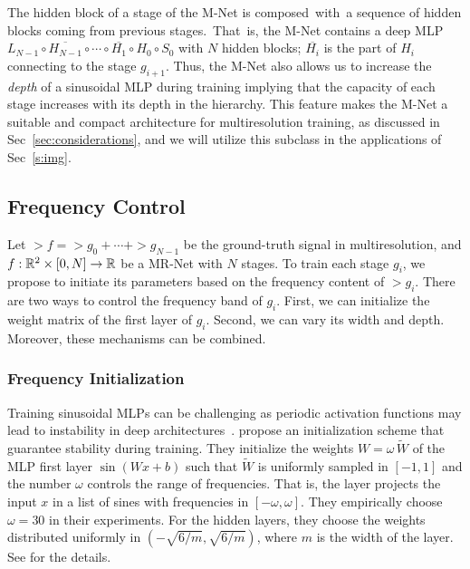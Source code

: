The hidden block of a stage of the M-Net is composed~with~a sequence of hidden blocks coming from previous stages.~That~is, the M-Net contains a deep MLP $L_{N-1} \circ \overline{H_{N-1}} \circ \cdots \circ \overline{H_1}\circ H_0 \circ S_0$ with $N$ hidden blocks; $\overline{H_i}$ is the part of $H_i$ connecting to the stage $g_{i+1}$.
Thus, the M-Net also allows us to increase the \textit{depth} of a sinusoidal MLP during training implying that the capacity of each stage increases with its depth in the hierarchy.
This feature makes the M-Net a suitable and compact architecture for  multiresolution training, as discussed in Sec~\ref{sec:considerations}, and we will utilize this subclass in the applications of Sec~\ref{s:img}.


\subsection{Frequency Control}
\label{s-frequency-control}

Let $\gt{f}=\gt{g}_0+\cdots+\gt{g}_{N-1}$ be the ground-truth signal in multiresolution, and $f:\mathbb{R}^2\times [0,N]\to \mathbb{R}$ be a MR-Net with $N$ stages. To train each stage $g_i$, we propose to initiate its parameters based on the frequency content of $\gt{g}_i$.
There are two ways to control the frequency band of $g_i$. First, we can initialize the weight matrix of the first layer of $g_i$. Second, we can vary its width and depth. Moreover, these mechanisms can be combined.


\subsubsection{Frequency Initialization}
\label{s-frequency-initialization}


Training sinusoidal MLPs can be challenging  as periodic activation functions may lead to instability in deep architectures~\cite{taming2017}. \citet{sitzmann2019siren} propose an initialization scheme that guarantee stability during training. 
They initialize the weights $W=\omega \, \tilde{W}$ of the MLP first layer $ \sin\left(Wx + b\right)$ such that $\tilde{W}$ is uniformly sampled in $[-1,1]$ and the number $\omega$ controls the range of frequencies. That is, the layer projects the input $x$ in a list of sines with frequencies in $[-\omega, \omega]$. 
They empirically choose $\omega=30$ in their experiments. For the hidden layers, they choose the weights distributed uniformly in $\left(-\sqrt{6/m}, \sqrt{6/m}\right)$, where $m$ is the width of the layer. See \cite{sitzmann2019siren} for the details.

